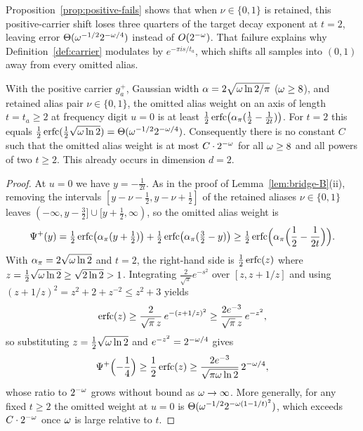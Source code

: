 Proposition~\ref{prop:positive-fails} shows that when $\nu\in\{0,1\}$ is retained, this positive-carrier shift loses three quarters of the target decay exponent at $t=2$, leaving error $\Theta(\omega^{-1/2}2^{-\omega/4})$ instead of $O(2^{-\omega})$. That failure explains why Definition~\ref{def:carrier} modulates by $e^{-\pi i s/t_a}$, which shifts all samples into $(0,1)$ away from every omitted alias.

\begin{proposition}\label{prop:positive-fails}
With the positive carrier $g_a^+$, Gaussian width $\alpha=2\sqrt{\omega\ln 2/\pi}$ ($\omega\ge 8$), and retained alias pair
$\nu\in\{0,1\}$, the omitted alias weight on an axis of length $t=t_a\ge 2$ at frequency digit $u=0$ is at least
$\tfrac12\operatorname{erfc}\bigl(\alpha_\pi(\tfrac12-\frac{1}{2t})\bigr)$. For $t=2$ this equals
$\tfrac12\operatorname{erfc}(\tfrac12\sqrt{\omega\ln 2})=\Theta(\omega^{-1/2}2^{-\omega/4})$. Consequently there is no constant $C$ such that
the omitted alias weight is at most $C\cdot 2^{-\omega}$ for all $\omega\ge 8$ and all powers of two $t\ge 2$. This already
occurs in dimension $d=2$.
\end{proposition}

\begin{proof}
At $u=0$ we have $y=-\frac{1}{2t}$. As in the proof of Lemma~\ref{lem:bridge-B}(ii), removing the intervals
$[y-\nu-\tfrac12,y-\nu+\tfrac12]$ of the retained aliases $\nu\in\{0,1\}$ leaves
$(-\infty,y-\tfrac32]\cup[y+\tfrac12,\infty)$, so the omitted alias weight is
\[
  \Psi^+(y)=\tfrac12\operatorname{erfc}\bigl(\alpha_\pi(y+\tfrac12)\bigr)+\tfrac12\operatorname{erfc}\bigl(\alpha_\pi(\tfrac32-y)\bigr)
  \ge\tfrac12\operatorname{erfc}\Bigl(\alpha_\pi\Bigl(\frac12-\frac{1}{2t}\Bigr)\Bigr).
\]
With $\alpha_\pi=2\sqrt{\omega\ln 2}$ and $t=2$, the right-hand side is $\tfrac12\operatorname{erfc}(z)$ where
$z=\tfrac12\sqrt{\omega\ln 2}\ge\sqrt{2\ln 2}>1$. Integrating $\frac{2}{\sqrt\pi}e^{-s^2}$ over $[z,z+1/z]$ and using
$(z+1/z)^2=z^2+2+z^{-2}\le z^2+3$ yields
\[
  \operatorname{erfc}(z)\ge\frac{2}{\sqrt\pi\,z}\,e^{-(z+1/z)^2}\ge\frac{2e^{-3}}{\sqrt\pi\,z}\,e^{-z^2},
\]
so substituting $z=\tfrac12\sqrt{\omega\ln 2}$ and $e^{-z^2}=2^{-\omega/4}$ gives
\[
  \Psi^+\Bigl(-\frac14\Bigr)\ge\frac12\operatorname{erfc}(z)\ge\frac{2e^{-3}}{\sqrt{\pi\omega\ln 2}}\,2^{-\omega/4},
\]
whose ratio to $2^{-\omega}$ grows without bound as $\omega\to\infty$. More generally, for any fixed $t\ge 2$ the omitted
weight at $u=0$ is $\Theta(\omega^{-1/2}2^{-\omega(1-1/t)^2})$, which exceeds $C\cdot 2^{-\omega}$ once $\omega$ is large relative
to $t$.
\end{proof}

